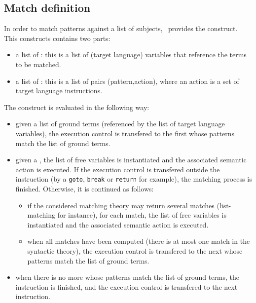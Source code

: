 \subsection{Match definition}

In order to match patterns against a list of subjects, \TOM\ provides
the  construct.
This constructs contains two parts:
\begin{itemize}
\item a list of : this is a list of (target
  language) variables that reference the terms to be matched.
\item a list of : this is a list of pairs
  (pattern,action), where an action is a set of target language
  instructions.  
\end{itemize}

The  construct is evaluated in the following way:
\begin{itemize}
\item given a list of ground terms (referenced by the list of target
  language variables), the execution control is transfered to the
  first  whose patterns match the list of ground
  terms.
\item given a , the list of free variables is
  instantiated and the associated semantic action is executed.
  If the execution control is transfered outside the
   instruction (by a \texttt{goto}, \texttt{break} or
  \texttt{return} for example), the matching process is finished.
  Otherwise, it is continued as follows:
  \begin{itemize}
  \item if the considered matching theory may return several matches
    (list-matching for instance), for each match, the list of free
    variables is instantiated and the associated semantic action is
    executed.
  \item when all matches have been computed (there is at most one match
    in the syntactic theory), the execution control is transfered to
    the next  whose patterns match the list of
    ground terms. 
  \end{itemize}

\item when there is no more  whose patterns
  match the list of ground terms, the  instruction is
  finished, and the execution control is transfered to the next
  instruction. 
\end{itemize}

